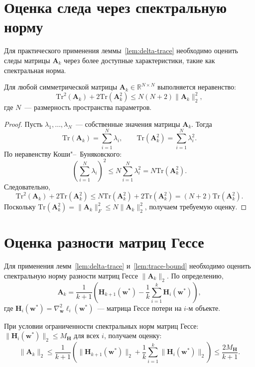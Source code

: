 \section{Оценка следа через спектральную норму}

Для практического применения леммы~\ref{lem:delta-trace} необходимо оценить следы матрицы $\mathbf{A}_k$ через более доступные характеристики, такие как спектральная норма.

\begin{lemma}\label{lem:trace-bound}
Для любой симметрической матрицы $\mathbf{A}_k \in \mathbb{R}^{N \times N}$ выполняется неравенство:
\begin{equation}
\label{eq:trace-bound}
\mathrm{Tr}^2(\mathbf{A}_k) + 2\mathrm{Tr}(\mathbf{A}_k^2) \leqslant N(N+2)\|\mathbf{A}_k\|_2^2,
\end{equation}
где $N$~--- размерность пространства параметров.
\end{lemma}

\begin{proof}
Пусть $\lambda_1, \ldots, \lambda_N$~--- собственные значения матрицы $\mathbf{A}_k$. Тогда
\[
\mathrm{Tr}(\mathbf{A}_k) = \sum_{i=1}^N \lambda_i, \qquad \mathrm{Tr}(\mathbf{A}_k^2) = \sum_{i=1}^N \lambda_i^2.
\]
По неравенству Коши"--~Буняковского:
\[
\left(\sum_{i=1}^N \lambda_i\right)^2 \leqslant N \sum_{i=1}^N \lambda_i^2 = N \mathrm{Tr}(\mathbf{A}_k^2).
\]
Следовательно,
\[
\mathrm{Tr}^2(\mathbf{A}_k) + 2\mathrm{Tr}(\mathbf{A}_k^2) \leqslant N \mathrm{Tr}(\mathbf{A}_k^2) + 2\mathrm{Tr}(\mathbf{A}_k^2) = (N+2)\mathrm{Tr}(\mathbf{A}_k^2).
\]
Поскольку $\mathrm{Tr}(\mathbf{A}_k^2) = \|\mathbf{A}_k\|_F^2 \leqslant N \|\mathbf{A}_k\|_2^2$, получаем требуемую оценку.
\end{proof}

\section{Оценка разности матриц Гессе}

Для применения лемм~\ref{lem:delta-trace} и~\ref{lem:trace-bound} необходимо оценить спектральную норму разности матриц Гессе $\|\mathbf{A}_k\|_2$. По определению,
\[
\mathbf{A}_k = \frac{1}{k+1}\left(\mathbf{H}_{k+1}(\mathbf{w}^*) - \frac{1}{k}\sum_{i=1}^k \mathbf{H}_i(\mathbf{w}^*)\right),
\]
где $\mathbf{H}_i(\mathbf{w}^*) = \nabla^2_{\mathbf{w}} \ell_i(\mathbf{w}^*)$~--- матрица Гессе потери на $i$-м объекте.

При условии ограниченности спектральных норм матриц Гессе: $\|\mathbf{H}_i(\mathbf{w}^*)\|_2 \leqslant M_{\mathbf{H}}$ для всех $i$, получаем оценку:
\begin{equation}
\label{eq:A-bound}
\|\mathbf{A}_k\|_2 \leqslant \frac{1}{k+1}\left(\|\mathbf{H}_{k+1}(\mathbf{w}^*)\|_2 + \frac{1}{k}\sum_{i=1}^k \|\mathbf{H}_i(\mathbf{w}^*)\|_2\right) \leqslant \frac{2M_{\mathbf{H}}}{k+1}.
\end{equation}

